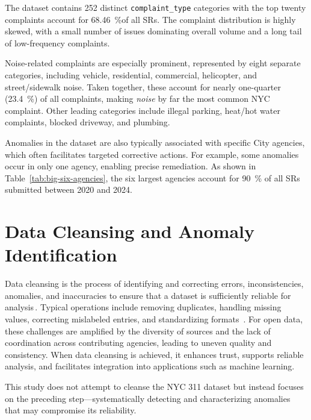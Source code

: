 \documentclass[linenumber]{jdsart}
\begin{document}
The dataset contains 252 distinct \texttt{complaint\_type} categories with
the top twenty complaints account for \SI[round-precision = 2]{68.46}{\percent}of all SRs. The
complaint distribution is highly skewed, with a small number of issues
dominating overall volume and a long tail of low-frequency complaints.

Noise-related complaints are especially prominent, represented by eight
separate categories, including vehicle, residential, commercial, helicopter,
and street/sidewalk noise. Taken together, these account for nearly one-quarter
(\SI[round-precision = 1]{23.4}{\percent}) of all complaints, making
\emph{noise} by far the most common NYC complaint. Other leading categories
include illegal parking, heat/hot water complaints, blocked driveway, and plumbing.

Anomalies in the dataset are also typically associated with specific City
agencies, which often facilitates targeted corrective actions. For example,
some anomalies occur in only one agency, enabling precise remediation.
As shown in Table~\ref{tab:big-six-agencies}, the six largest agencies account
for \SI[round-precision = 0]{90}{\percent} of all SRs submitted between 2020 and 2024.


\section{Data Cleansing and Anomaly Identification}
\label{sec:anomalies}
Data cleansing is the process of identifying and correcting errors,
inconsistencies, anomalies, and inaccuracies to ensure that a dataset is
sufficiently reliable for analysis\,\citep{maletic2005data,hosseinzadeh2023data}.
Typical operations include removing duplicates, handling missing values,
correcting mislabeled entries, and standardizing formats
\,\citep[e.g.,][]{cody2017cody,van2018statistical}. For open data, these
challenges are amplified by the diversity of sources and the lack of
coordination across contributing agencies, leading to uneven quality and
consistency. When data cleansing is achieved, it enhances trust, supports
reliable analysis, and facilitates integration into applications such as
machine learning.

This study does not attempt to cleanse the NYC 311 dataset but instead focuses
on the preceding step—systematically detecting and characterizing anomalies
that may compromise its reliability.
\end{document}
